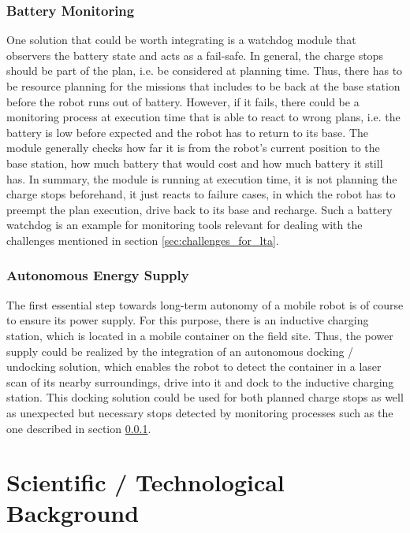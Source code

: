 \documentclass[english, master, expose, utf8]{base/thesis_KBS}
\begin{document}
\subsubsection{Battery Monitoring}
\label{sec:battery_monitoring}

One solution that could be worth integrating is a watchdog module that observers the battery state and acts as a fail-safe. In general, the charge stops should
be part of the plan, i.e. be considered at planning time. Thus, there has to be resource planning for the missions that includes to be back at the base station before
the robot runs out of battery. However, if it fails, there could be a monitoring process at execution time that is able to react to wrong plans, i.e. the battery is
low before expected and the robot has to return to its base. The module generally checks how far it is from the robot's current position to the base station, how much
battery that would cost and how much battery it still has. In summary, the module is running at execution time, it is not planning the charge stops beforehand,
it just reacts to failure cases, in which the robot has to preempt the plan execution, drive back to its base and recharge.
Such a battery watchdog is an example for monitoring tools relevant for dealing with the challenges mentioned in section \ref{sec:challenges_for_lta}.

\subsubsection{Autonomous Energy Supply}

The first essential step towards long-term autonomy of a mobile robot is of course to ensure its power supply.
For this purpose, there is an inductive charging station, which is located in a mobile container on the field site.
Thus, the power supply could be realized by the integration of an autonomous docking / undocking solution, which enables the robot to detect
the container in a laser scan of its nearby surroundings, drive into it and dock to the inductive charging station.
This docking solution could be used for both planned charge stops as well as unexpected but necessary stops detected by monitoring processes such
as the one described in section \ref{sec:battery_monitoring}.

\section{Scientific / Technological Background}
\end{document}
